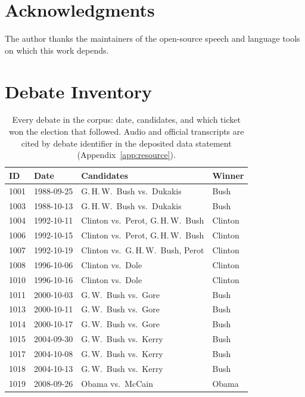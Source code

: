 \documentclass[journal]{IEEEtran}
\begin{document}
\section*{Acknowledgments}
The author thanks the maintainers of the open-source speech and language tools
on which this work depends.

\appendices

\section{Debate Inventory}
\label{app:inventory}

\begin{table}[h]
\caption{Every debate in the corpus: date, candidates, and which ticket won
the election that followed. Audio and official transcripts are cited by
debate identifier in the deposited data statement (Appendix~\ref{app:resource}).}
\label{tab:inventory}
\centering
\scriptsize
\setlength{\tabcolsep}{2pt}
\begin{tabular}{llp{}l}
\toprule
ID & Date & Candidates & Winner \\
\midrule
1001 & 1988-09-25 & G.\,H.\,W.\ Bush vs.\ Dukakis & Bush \\
1003 & 1988-10-13 & G.\,H.\,W.\ Bush vs.\ Dukakis & Bush \\
1004 & 1992-10-11 & Clinton vs.\ Perot, G.\,H.\,W.\ Bush & Clinton \\
1006 & 1992-10-15 & Clinton vs.\ Perot, G.\,H.\,W.\ Bush & Clinton \\
1007 & 1992-10-19 & Clinton vs.\ G.\,H.\,W.\ Bush, Perot & Clinton \\
1008 & 1996-10-06 & Clinton vs.\ Dole & Clinton \\
1010 & 1996-10-16 & Clinton vs.\ Dole & Clinton \\
1011 & 2000-10-03 & G.\,W.\ Bush vs.\ Gore & Bush \\
1013 & 2000-10-11 & G.\,W.\ Bush vs.\ Gore & Bush \\
1014 & 2000-10-17 & G.\,W.\ Bush vs.\ Gore & Bush \\
1015 & 2004-09-30 & G.\,W.\ Bush vs.\ Kerry & Bush \\
1017 & 2004-10-08 & G.\,W.\ Bush vs.\ Kerry & Bush \\
1018 & 2004-10-13 & G.\,W.\ Bush vs.\ Kerry & Bush \\
1019 & 2008-09-26 & Obama vs.\ McCain & Obama \\

\end{tabular}
\end{table}
\end{document}
